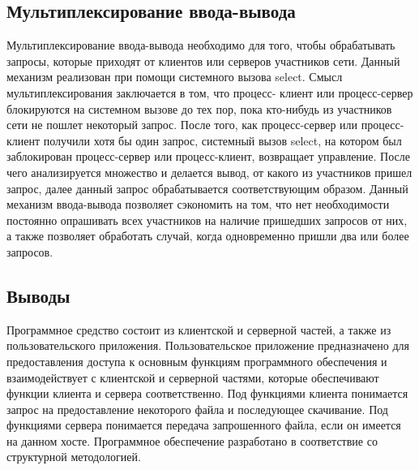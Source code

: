 \subsection{Мультиплексирование ввода-вывода}
Мультиплексирование ввода-вывода необходимо для того, чтобы
обрабатывать запросы, которые приходят от клиентов или серверов
участников сети. Данный механизм реализован при помощи системного
вызова select. Смысл мультиплексирования заключается в том, что процесс-
клиент или процесс-сервер блокируются на системном вызове до тех пор,
пока кто-нибудь из участников сети не пошлет некоторый запрос. После того,
как процесс-сервер или процесс-клиент получили хотя бы один запрос,
системный вызов select, на котором был заблокирован процесс-сервер или
процесс-клиент, возвращает управление. После чего анализируется
множество и делается вывод, от какого из участников пришел запрос, далее
данный запрос обрабатывается соответствующим образом. Данный механизм
ввода-вывода позволяет сэкономить на том, что нет необходимости постоянно
опрашивать всех участников на наличие пришедших запросов от них, а также
позволяет обработать случай, когда одновременно пришли два или более
запросов.
\subsection*{Выводы}
Программное средство состоит из клиентской и серверной частей, а также из
пользовательского приложения. Пользовательское приложение предназначено
для предоставления доступа к основным функциям программного
обеспечения и взаимодействует с клиентской и серверной частями, которые
обеспечивают функции клиента и сервера соответственно. Под функциями
клиента понимается запрос на предоставление некоторого файла и
последующее скачивание. Под функциями сервера понимается передача
запрошенного файла, если он имеется на данном хосте. Программное
обеспечение разработано в соответствие со структурной методологией.
